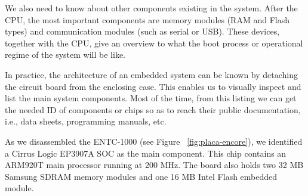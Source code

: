 \documentclass[conference]{IEEEtran}
\newcommand{\nota}[1]{}
\begin{document}
We also need to know about other components existing in the system. After the CPU, the most important components are memory modules (RAM and Flash types) and communication modules (such as serial or USB). These devices, together with the CPU, give an overview to what the boot process or operational regime of the system will be like.

\nota {En la práctica, la arquitectura de un sistema embebido particular puede conocerse desmontando
la placa del circuito impreso de la caja exterior. Esto posibilita
inspeccionar visualmente y listar todos los componentes principales con los
que está compuesto el sistema. A partir de este listado, puede
obtenerse, en la mayoría de los casos, la documentación pública
de cada uno de los componentes o chips listados.
A este tipo de documentación se conoce como hoja de datos, o
en algunos casos (como el de las memorias o CPU) manuales de programación
del chip.}

In practice, the architecture of an embedded system can be known by detaching the circuit board from the enclosing case. This enables us to visually inspect and list the main system components. Most of the time, from this listing we can get the needed ID of components or chips so as to reach their public documentation, i.e., data sheets, programming manuals, etc.


\nota { 
En nuestro caso de estudio, al desmontar el ENTC-1000 (ver la Figura ~\ref{fig:placa-encore} )
, identificamos
un SOC Cirrus Logic EP3907A como el componente principal,
que contiene un procesador central de arquitectura ARM, modelo ARM920T
a una velocidad de 200Mhz.
Además, la placa presenta dos módulos de memoria SDRAM Samsung de 32MB cada uno, y un modulo
de memoria Flash embebida INTEL de 16MB.
}

As we disassembled the ENTC-1000 (see Figure ~\ref{fig:placa-encore}), we identified a Cirrus Logic EP3907A SOC as the main component. This chip contains an ARM920T main processor running at 200 MHz. The board also holds two 32 MB Samsung SDRAM memory modules and one 16 MB Intel Flash embedded module.
\end{document}
